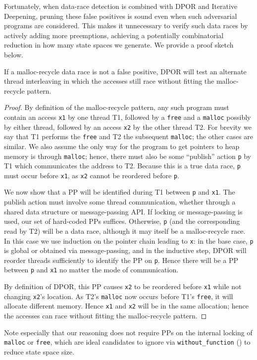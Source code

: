 Fortunately, when data-race detection is combined with DPOR and Iterative Deepening, pruning these false positives is sound even when such adversarial programs are considered.
This makes it unnecessary to verify such data races by actively adding more preemptions,
achieving a potentially combinatorial reduction in how many state spaces we generate.
We provide a proof sketch below.

\begin{theorem}
If a malloc-recycle data race is not a false positive,
DPOR will test an alternate thread interleaving in which
the accesses still race without fitting the malloc-recycle pattern.
\end{theorem}

\begin{proof}
By definition of the malloc-recycle pattern,
any such program must contain an access {\tt x1} by one thread T1,
followed by a {\tt free} and a {\tt malloc} possibly by either thread,
followed by an access {\tt x2} by the other thread T2. %
For brevity we say that T1 performs the {\tt free} and T2 the subsequent {\tt malloc}; the other cases are similar.
We also assume the only way for the program to get pointers to heap memory is through {\tt malloc};
hence, there must also be some ``publish'' action {\tt p} by T1 which communicates the address to T2.
Because this is a true data race, {\tt p} must occur before {\tt x1}, as {\tt x2} cannot be reordered before {\tt p}.

We now show that a PP will be identified during T1 between {\tt p} and {\tt x1}.
The publish action must involve some thread communication, whether through a shared data structure or message-passing API.
If locking or message-passing is used, our set of hard-coded PPs suffices.
Otherwise, {\tt p} (and the corresponding read by T2) will be a data race, although it may itself be a malloc-recycle race.
In this case we use induction on the pointer chain leading to {\tt x}:
in the base case, {\tt p} is global or obtained via message-passing,
and in the inductive step, DPOR will reorder threads sufficiently to identify the PP on {\tt p}.
Hence there will be a PP between {\tt p} and {\tt x1} no matter the mode of communication.

By definition of DPOR, this PP causes {\tt x2} to be reordered before {\tt x1} while not changing {\tt x2}'s location.
As T2's {\tt malloc} now occurs before T1's {\tt free}, it will allocate different memory.
Hence {\tt x1} and {\tt x2} will be in the same allocation;
hence the accesses can race without fitting the malloc-recycle pattern.
\end{proof}
\renewcommand\proofname{Proof}

Note especially that our reasoning does not require PPs on the internal locking of {\tt malloc} or {\tt free},
which are ideal candidates to ignore via {\tt without\_function} (\sect{\ref{sec:landslide}}) to reduce state space size.
